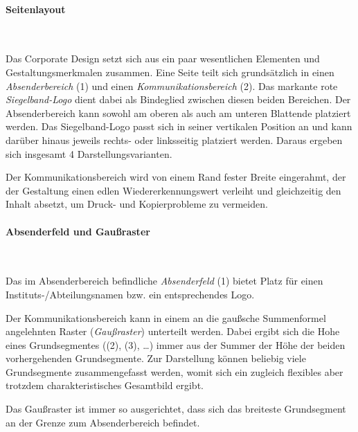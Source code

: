 \paragraph{Seitenlayout}\hfill\\
\begin{minipage}[t]{0.45\textwidth}
\vspace*{0pt}
\centering{}%
\end{minipage}
\begin{minipage}[t]{0.55\textwidth}
\vspace*{0pt}
Das Corporate Design setzt sich aus ein paar wesentlichen Elementen und
Gestaltungsmerkmalen zusammen.
Eine Seite teilt sich grundsätzlich in einen \emph{Absenderbereich} (1) und einen
\emph{Kommunikationsbereich} (2).
Das markante rote \emph{Siegelband-Logo} dient dabei als Bindeglied zwischen
diesen beiden Bereichen. 
Der Absenderbereich kann sowohl am oberen als auch am unteren Blattende
platziert werden.
Das Siegelband-Logo passt sich in seiner vertikalen Position an und kann darüber hinaus
jeweils rechts- oder linksseitig platziert werden.
Daraus ergeben sich insgesamt 4 Darstellungsvarianten.

Der Kommunikationsbereich wird von einem Rand fester Breite eingerahmt,
der der Gestaltung einen edlen Wiedererkennungswert verleiht und gleichzeitig
den Inhalt absetzt, um Druck- und Kopierprobleme zu vermeiden.
\end{minipage}\bigskip

\paragraph{Absenderfeld und Gaußraster}\hfill\\
\begin{minipage}[t]{0.45\textwidth}
\vspace*{0pt}
\centering{}%
\end{minipage}
\begin{minipage}[t]{0.55\textwidth}
\vspace*{0pt}
Das im Absenderbereich befindliche \emph{Absenderfeld} (1) bietet Platz für
einen Instituts-/Abteilungsnamen bzw. ein entsprechendes Logo.

Der Kommunikationsbereich kann in einem an die gaußsche Summenformel
angelehnten Raster (\emph{Gaußraster}) unterteilt werden.
Dabei ergibt sich die Hohe eines Grundsegmentes ((2), (3), \ldots)
immer aus der Summer der Höhe der beiden vorhergehenden Grundsegmente.
Zur Darstellung können beliebig viele Grundsegmente zusammengefasst werden,
womit sich ein zugleich flexibles aber trotzdem charakteristisches
Gesamtbild ergibt.

Das Gaußraster ist immer so ausgerichtet, dass sich das breiteste Grundsegment
an der Grenze zum Absenderbereich befindet.
\end{minipage}

